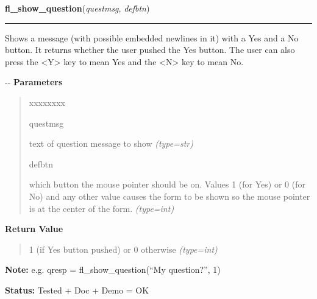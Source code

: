 \hspace{.8\funcindent}\begin{boxedminipage}{\funcwidth}

    \raggedright \textbf{fl\_show\_question}(\textit{questmsg}, \textit{defbtn})

    \vspace{-1.5ex}

    \rule{\textwidth}{0.5\fboxrule}
\setlength{\parskip}{2ex}

Shows a message (with possible embedded newlines in it) with a Yes
and a No button. It returns whether the user pushed the Yes button. The
user can also press the <Y> key to mean Yes and the <N> key to mean No.

-{}-
\setlength{\parskip}{1ex}
      \textbf{Parameters}
      \vspace{-1ex}

      \begin{quote}
        \begin{Ventry}{xxxxxxxx}

          \item[questmsg]


text of question message to show
            {\it (type=str)}

          \item[defbtn]


which button the mouse pointer should be on. Values 1  (for Yes) or 0
(for No) and any other value causes the form to be shown so the mouse
pointer is at the center of the form.
            {\it (type=int)}

        \end{Ventry}

      \end{quote}

      \textbf{Return Value}
    \vspace{-1ex}

      \begin{quote}

1 (if Yes button pushed) or 0 otherwise
      {\it (type=int)}

      \end{quote}

\textbf{Note:} 
e.g. qresp = fl\_show\_question(``My question?'', 1)


\textbf{Status:} 
Tested + Doc + Demo = OK


    \end{boxedminipage}

    \label{xformslib:flgoodies:fl_hide_question}

